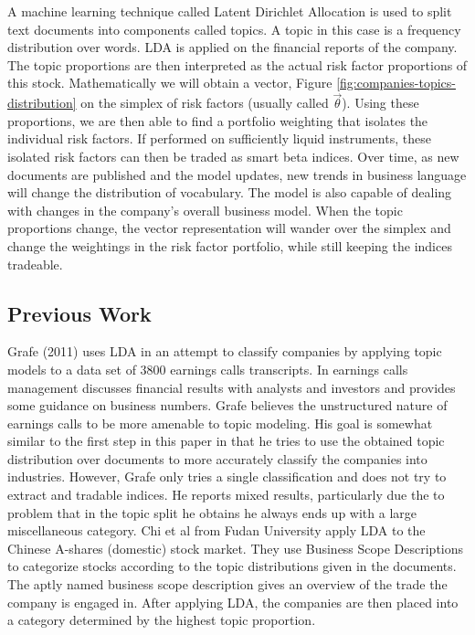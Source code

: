 \documentclass[12pt,journal,letterpaper,oneside,onecolumn]{IEEEtran}
\begin{document}
A machine learning technique called Latent Dirichlet Allocation is
used to split text documents into components called topics.
A topic in this case is a frequency distribution over words.
LDA is applied on the financial reports of the company.
The topic proportions are then interpreted as the actual risk factor proportions of this stock.
Mathematically we will obtain a vector, Figure \ref{fig:companies-topics-distribution} on the simplex of risk factors (usually called $\vec{\theta}$).
Using these proportions, we are then able to find a portfolio weighting that isolates the individual risk factors.
If performed on sufficiently liquid instruments, these isolated risk factors can then be traded as smart beta indices.
Over time, as new documents are published and the model updates, new trends in business language will change the distribution of vocabulary. 
The model is also capable of dealing with changes in the company's overall business model. When the topic proportions change, the vector representation will wander over the simplex and change the weightings in the risk factor portfolio, while still keeping the indices tradeable.

\subsection{Previous Work}
Grafe (2011) uses LDA in an attempt to classify companies by applying topic models to a data set of 3800 earnings calls transcripts. In earnings calls management discusses financial results with analysts and investors and
provides some guidance on business numbers.
Grafe believes the unstructured nature of earnings calls to be more amenable to
topic modeling.
His goal is somewhat similar to the first step in this paper in that he tries to use
the obtained topic distribution over documents to more accurately classify the
companies into industries. However, Grafe only tries a single classification and does
not try to extract and tradable indices.
He reports mixed results, particularly due the to problem that in the topic split he obtains he always ends up with a large miscellaneous category.
Chi et al from Fudan University apply LDA to the Chinese A-shares (domestic) stock market. They use Business Scope Descriptions to categorize stocks according to the topic distributions given in the documents. The aptly named business scope
description gives an overview of the trade the company is engaged in. After applying
LDA, the companies are then placed into a category determined by the highest topic
proportion.
\end{document}
